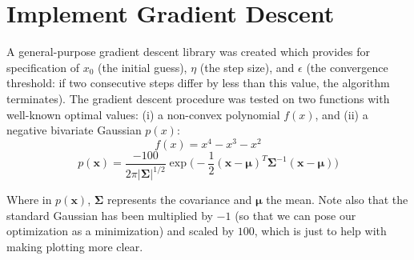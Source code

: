 \documentclass{article}
\begin{document}
 



\section{Implement Gradient Descent}
A general-purpose gradient descent library was created which provides for specification of $x_0$ (the initial guess), $\eta$ (the step size), and $\epsilon$ (the convergence threshold: if two consecutive steps differ by less than this value, the algorithm terminates).  The gradient descent procedure was tested on two functions with well-known optimal values: (i)  a non-convex polynomial $f(x)$, and (ii) a negative bivariate Gaussian $p(x)$:
$$f(x) = x^4 - x^3 -x^2$$
$$p(\mathbf{x}) = \frac{-100}{2\pi|\mathbf{\Sigma}|^{1/2}}\exp{\bigg(-\frac{1}{2} (\mathbf{x} - \boldsymbol{\mu})^T\mathbf{\Sigma}^{-1} (\mathbf{x} - \boldsymbol{\mu}) \bigg)}$$

Where in $p(\mathbf{x})$, $\mathbf{\Sigma}$ represents the covariance and $\boldsymbol{\mu}$ the mean.  Note also that the standard Gaussian has been multiplied by $-1$ (so that we can pose our optimization as a minimization) and scaled by $100$, which is just to help with making plotting more clear.
\end{document}
